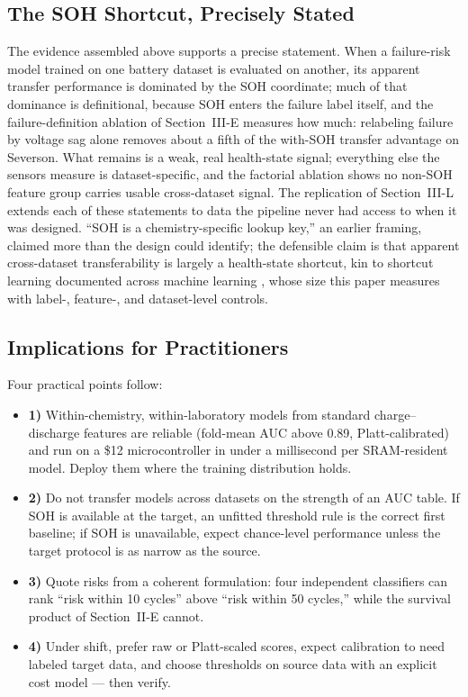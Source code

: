 \documentclass[11pt,a4paper]{article}
\begin{document}
\subsection{The SOH Shortcut, Precisely Stated}
The evidence assembled above supports a precise statement. When a failure-risk model trained on one battery dataset is evaluated on another, its apparent transfer performance is dominated by the SOH coordinate; much of that dominance is definitional, because SOH enters the failure label itself, and the failure-definition ablation of Section~III-E measures how much: relabeling failure by voltage sag alone removes about a fifth of the with-SOH transfer advantage on Severson. What remains is a weak, real health-state signal; everything else the sensors measure is dataset-specific, and the factorial ablation shows no non-SOH feature group carries usable cross-dataset signal. The replication of Section~III-L extends each of these statements to data the pipeline never had access to when it was designed. ``SOH is a chemistry-specific lookup key,'' an earlier framing, claimed more than the design could identify; the defensible claim is that apparent cross-dataset transferability is largely a health-state shortcut, kin to shortcut learning documented across machine learning \cite{geirhos2020shortcut}, whose size this paper measures with label-, feature-, and dataset-level controls.

\subsection{Implications for Practitioners}
Four practical points follow:
\begin{itemize}
\item \textbf{1)} Within-chemistry, within-laboratory models from standard charge--discharge features are reliable (fold-mean AUC above 0.89, Platt-calibrated) and run on a \$12 microcontroller in under a millisecond per SRAM-resident model. Deploy them where the training distribution holds.
\item \textbf{2)} Do not transfer models across datasets on the strength of an AUC table. If SOH is available at the target, an unfitted threshold rule is the correct first baseline; if SOH is unavailable, expect chance-level performance unless the target protocol is as narrow as the source.
\item \textbf{3)} Quote risks from a coherent formulation: four independent classifiers can rank ``risk within 10 cycles'' above ``risk within 50 cycles,'' while the survival product of Section~II-E cannot.
\item \textbf{4)} Under shift, prefer raw or Platt-scaled scores, expect calibration to need labeled target data, and choose thresholds on source data with an explicit cost model --- then verify.
\end{itemize}
\end{document}
